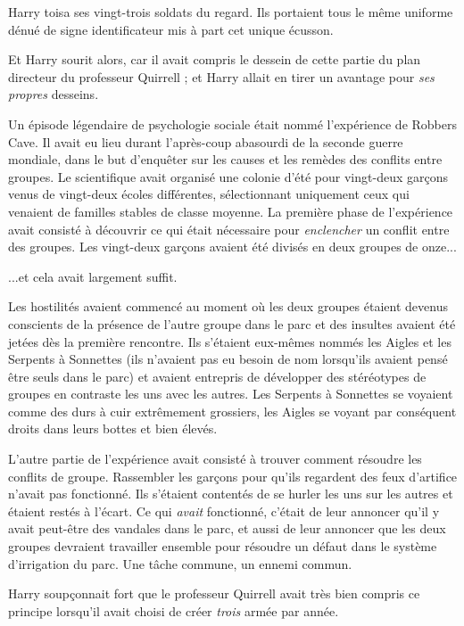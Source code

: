 Harry toisa ses vingt-trois soldats du regard. Ils portaient tous le même uniforme dénué de signe identificateur mis à part cet unique écusson.

Et Harry sourit alors, car il avait compris le dessein de cette partie du plan directeur du professeur Quirrell ; et Harry allait en tirer un avantage pour \emph{ses propres}  desseins.

Un épisode légendaire de psychologie sociale était nommé l'expérience de Robbers Cave. Il avait eu lieu durant l'après-coup abasourdi de la seconde guerre mondiale, dans le but d'enquêter sur les causes et les remèdes des conflits entre groupes. Le scientifique avait organisé une colonie d'été pour vingt-deux garçons venus de vingt-deux écoles différentes, sélectionnant uniquement ceux qui venaient de familles stables de classe moyenne. La première phase de l'expérience avait consisté à découvrir ce qui était nécessaire pour \emph{enclencher}  un conflit entre des groupes. Les vingt-deux garçons avaient été divisés en deux groupes de onze...

...et cela avait largement suffit.

Les hostilités avaient commencé au moment où les deux groupes étaient devenus conscients de la présence de l'autre groupe dans le parc et des insultes avaient été jetées dès la première rencontre. Ils s'étaient eux-mêmes nommés les Aigles et les Serpents à Sonnettes (ils n'avaient pas eu besoin de nom lorsqu'ils avaient pensé être seuls dans le parc) et avaient entrepris de développer des stéréotypes de groupes en contraste les uns avec les autres. Les Serpents à Sonnettes se voyaient comme des durs à cuir extrêmement grossiers, les Aigles se voyant par conséquent droits dans leurs bottes et bien élevés.

L'autre partie de l'expérience avait consisté à trouver comment résoudre les conflits de groupe. Rassembler les garçons pour qu'ils regardent des feux d'artifice n'avait pas fonctionné. Ils s'étaient contentés de se hurler les uns sur les autres et étaient restés à l'écart. Ce qui \emph{avait}  fonctionné, c'était de leur annoncer qu'il y avait peut-être des vandales dans le parc, et aussi de leur annoncer que les deux groupes devraient travailler ensemble pour résoudre un défaut dans le système d'irrigation du parc. Une tâche commune, un ennemi commun.

Harry soupçonnait fort que le professeur Quirrell avait très bien compris ce principe lorsqu'il avait choisi de créer \emph{trois}  armée par année.

